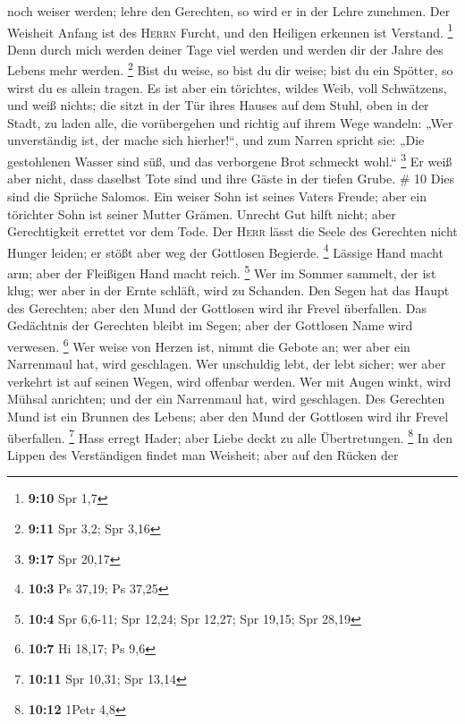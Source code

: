 noch weiser werden; lehre den Gerechten, so wird er in der Lehre
zunehmen.  Der Weisheit Anfang ist des \textsc{Herrn}
Furcht, und den Heiligen erkennen ist Verstand. \footnote{\textbf{9:10}
  Spr 1,7}  Denn durch mich werden deiner Tage viel
werden und werden dir der Jahre des Lebens mehr werden. \footnote{\textbf{9:11}
  Spr 3,2; Spr 3,16}  Bist du weise, so bist du dir
weise; bist du ein Spötter, so wirst du es allein tragen.
 Es ist aber ein törichtes, wildes Weib, voll Schwätzens,
und weiß nichts;  die sitzt in der Tür ihres Hauses auf
dem Stuhl, oben in der Stadt,  zu laden alle, die
vorübergehen und richtig auf ihrem Wege wandeln:  „Wer
unverständig ist, der mache sich hierher!{}``, und zum Narren spricht
sie:  „Die gestohlenen Wasser sind süß, und das
verborgene Brot schmeckt wohl.`` \footnote{\textbf{9:17} Spr 20,17}
 Er weiß aber nicht, dass daselbst Tote sind und ihre
Gäste in der tiefen Grube. \# 10  Dies sind die Sprüche
Salomos. Ein weiser Sohn ist seines Vaters Freude; aber ein törichter
Sohn ist seiner Mutter Grämen.  Unrecht Gut hilft nicht;
aber Gerechtigkeit errettet vor dem Tode.  Der
\textsc{Herr} lässt die Seele des Gerechten nicht Hunger leiden; er
stößt aber weg der Gottlosen Begierde. \footnote{\textbf{10:3} Ps 37,19;
  Ps 37,25}  Lässige Hand macht arm; aber der Fleißigen
Hand macht reich. \footnote{\textbf{10:4} Spr 6,6-11; Spr 12,24; Spr
  12,27; Spr 19,15; Spr 28,19}  Wer im Sommer sammelt, der
ist klug; wer aber in der Ernte schläft, wird zu Schanden.
 Den Segen hat das Haupt des Gerechten; aber den Mund der
Gottlosen wird ihr Frevel überfallen.  Das Gedächtnis der
Gerechten bleibt im Segen; aber der Gottlosen Name wird verwesen.
\footnote{\textbf{10:7} Hi 18,17; Ps 9,6}  Wer weise von
Herzen ist, nimmt die Gebote an; wer aber ein Narrenmaul hat, wird
geschlagen.  Wer unschuldig lebt, der lebt sicher; wer
aber verkehrt ist auf seinen Wegen, wird offenbar werden.
 Wer mit Augen winkt, wird Mühsal anrichten; und der ein
Narrenmaul hat, wird geschlagen.  Des Gerechten Mund ist
ein Brunnen des Lebens; aber den Mund der Gottlosen wird ihr Frevel
überfallen. \footnote{\textbf{10:11} Spr 10,31; Spr 13,14}
 Hass erregt Hader; aber Liebe deckt zu alle
Übertretungen. \footnote{\textbf{10:12} 1Petr 4,8}  In
den Lippen des Verständigen findet man Weisheit; aber auf den Rücken der
